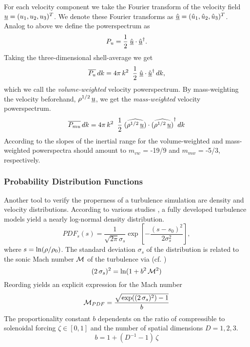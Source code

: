 For each velocity component we take the Fourier transform of the velocity field
$\underline{u} = (u_1, u_2, u_3)^T$.
We denote these Fourier transforms as
$\hat{\underline{u}} = (\hat{u}_1, \hat{u}_2, \hat{u}_3)^T$. Analog
to above we define the powerspectrum as
\begin{equation}
    P_{u} = \frac{1}{2} \; \hat{\underline{u}} \cdot \hat{\underline{u}}^{\dagger}.
\end{equation}
Taking the three-dimensional shell-average we get
\begin{equation}
    \overline{P_{u}}\,dk = 4 \pi\,k^2 \;\; \frac{1}{2} \; \hat{\underline{u}} \cdot \hat{\underline{u}}^{\dagger}\,dk,
\end{equation}
which we call the \emph{volume-weighted} velocity powerspectrum. By
mass-weighting the velocity beforehand, $\rho^{1/2}\,\underline{u}$, we get the
\emph{mass-weighted} velocity powerspectrum.
\begin{equation}
    \overline{P_{mu}}\,dk = 4 \pi\,k^2 \;\; \frac{1}{2} \; \widehat{(\rho^{1/2}\,\underline{u})} \cdot \widehat{(\rho^{1/2}\,\underline{u})}^{\dagger}\,dk
\end{equation}
According to \cite{kitsionas2009algorithmic} the slopes of the inertial range
for the volume-weighted and mass-weighted powerspectra should amount to
$m_{vw}$ = -19/9 and $m_{mw}$ = -5/3, respectively.

\subsubsection{Probability Distribution Functions}
\label{sec:theory-density-pdf}
Another tool to verify the properness of a turbulence simulation are density
and velocity distributions. According to various studies
\cite{federrath_klessen_schmidt_2008,hopkins_2013,1999intuconf218N,0004-637X-761-2-149},
a fully developed turbulence models yield a nearly log-normal density
distribution.
\begin{equation}
\label{eqn:density-pdf}
PDF_s(s) = \frac{1}{\sqrt{2\pi}\sigma_s} \exp\left[-\frac{(s-s_0)^2}{2\sigma_s^2}\right],
\end{equation}
where $s = \ln(\rho/\rho_0)$. The standard deviation $\sigma_s$ of
the distribution is related to the sonic Mach number $\mathcal{M}$ of the
turbulence via (cf. \cite{federrath_klessen_schmidt_2008,0004-637X-761-2-149})
\begin{equation}
(2\,\sigma_s)^2 = \ln(1 + b^2\,\mathcal{M}^2)
\end{equation}
Reording yields an explicit expression for the Mach number
\begin{equation}
\label{eqn:density-pdf-mach}
\mathcal{M}_{PDF} = \frac{\sqrt{\exp((2\,\sigma_s)^2) - 1}}{b}
\end{equation}
The proportionality constant $b$ dependents on the ratio of compressible to
solenoidal forcing $\zeta \in [0,1]$ and the number of spatial
dimensions $D = 1,2,3$.
\begin{equation}
\label{eqn:density-pdf-mach-constant}
b = 1 + (D^{-1} - 1) \, \zeta
\end{equation}
